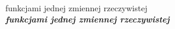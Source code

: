 \documentclass[a4paper,11pt]{article}
\begin{document}
\noindent
{} \\
\Jest  funkcjami jednej zmiennej rzeczywistej \\
\Powin \textbf{\textit{funkcjami jednej zmiennej rzeczywistej}} \\

\vspace{\spaceTwo}





























\end{document}
